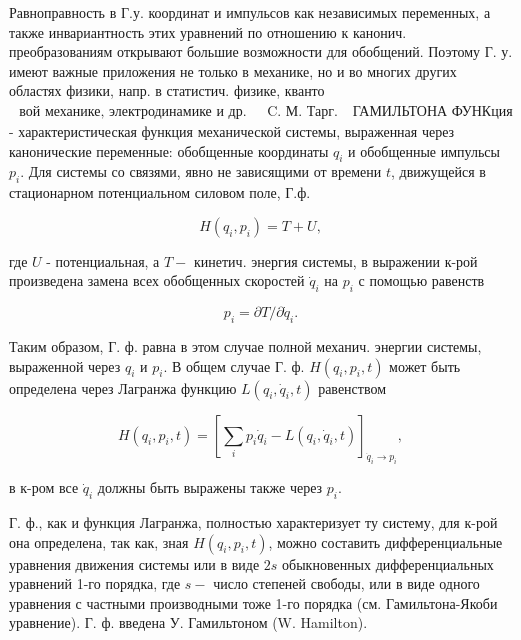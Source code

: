 \documentclass[10pt]{article}
\begin{document}
Равноправность в Г.у. координат и импульсов как независимых переменных, а также инвариантность этих уравнений по отношению к канонич. преобразованиям открывают большие возможности для обобщений. Поэтому Г. у. имеют важные приложения не только в механике, но и во многих других областях физики, напр. в статистич. физике, кванто$\begin{array}{ll}\text { вой механике, электродинамике и др. } & \text { C. М. Тарг. }\end{array}$ ГАМИЛЬТОНА ФУНКция - характеристическая функция механической системы, выраженная через канонические переменные: обобщенные координаты $q_{i}$ и обобщенные импульсы $p_{i}$. Для системы со связями, явно не зависящими от времени $t$, движущейся в стационарном потенциальном силовом поле, Г.ф.



\[

H\left(q_{i}, p_{i}\right)=T+U,

\]



где $U$ - потенциальная, а $T-$ кинетич. энергия системы, в выражении к-рой произведена замена всех обобщенных скоростей $\dot{q}_{i}$ на $p_{i}$ с помощью равенств



\[

p_{i}=\partial T / \partial \dot{q}_{i} .

\]



Таким образом, Г. ф. равна в этом случае полной механич. энергии системы, выраженной через $q_{i}$ и $p_{i}$. В общем случае Г. ф. $H\left(q_{i}, p_{i}, t\right)$ может быть определена через Лагранжа функцию $L\left(q_{i}, \dot{q}_{i}, t\right)$ равенством



\[

H\left(q_{i}, p_{i}, t\right)=\left[\sum_{i} p_{i} \dot{q}_{i}-L\left(q_{i}, \dot{q}_{i}, t\right)\right]_{\dot{q}_{i} \rightarrow p_{i}},

\]



в к-ром все $\dot{q}_{i}$ должны быть выражены также через $p_{i}$.



Г. ф., как и функция Лагранжа, полностью характеризует ту систему, для к-рой она определена, так как, зная $H\left(q_{i}, p_{i}, t\right)$, можно составить дифференциальные уравнения движения системы или в виде $2 s$ обыкновенных дифференциальных уравнений 1-го порядка, где $s-$ число степеней свободы, или в виде одного уравнения с частными производными тоже 1-го порядка (см. Гамильтона-Якоби уравнение). Г. ф. введена У. Гамильтоном (W. Hamilton).
\end{document}
